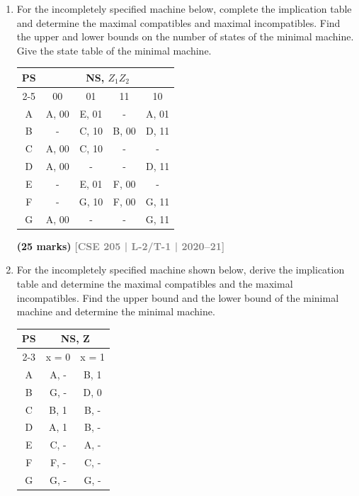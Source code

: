 \documentclass[12pt]{article}
\newcommand{\yr}[1]{\hfill\textcolor{gray}{\small\textbf{[#1]}}}
\newcommand{\mk}[1]{\textcolor{orange!70!black}{\small\textbf{(#1 marks)}}}
\begin{document}
\begin{enumerate}
\mk{15} \yr{CSE 205 | L-2/T-1 | 2021--22}



\item For the incompletely specified machine below, complete the implication table and determine the maximal compatibles and maximal incompatibles. Find the upper and lower bounds on the number of states of the minimal machine. Give the state table of the minimal machine.

\begin{center}
  \begin{tabular}{|c|c|c|c|c|}
\hline
PS & \multicolumn{4}{c|}{NS, $Z_1Z_2$} \\
\cline{2-5}
 & 00 & 01 & 11 & 10 \\
\hline
A & A, 00 & E, 01 & - & A, 01 \\
\hline
B & - & C, 10 & B, 00 & D, 11 \\
\hline
C & A, 00 & C, 10 & - & - \\
\hline
D & A, 00 & - & - & D, 11 \\
\hline
E & - & E, 01 & F, 00 & - \\
\hline
F & - & G, 10 & F, 00 & G, 11 \\
\hline
G & A, 00 & - & - & G, 11 \\
\hline
\end{tabular}
\end{center}
\mk{25} \yr{CSE 205 | L-2/T-1 | 2020--21}



\item For the incompletely specified machine shown below, derive the implication table and determine the maximal compatibles and the maximal incompatibles. Find the upper bound and the lower bound of the minimal machine and determine the minimal machine.

\begin{center}
  \begin{tabular}{|c|c|c|}
\hline
\multirow{2}{*}{PS} & \multicolumn{2}{c|}{NS, Z} \\ \cline{2-3} 
 & x = 0 & x = 1 \\ \hline
A & A, - & B, 1 \\ \hline
B & G, - & D, 0 \\ \hline
C & B, 1 & B, - \\ \hline
D & A, 1 & B, - \\ \hline
E & C, - & A, - \\ \hline
F & F, - & C, - \\ \hline
G & G, - & G, - \\ \hline
\end{tabular}
\end{center}


\end{enumerate}
\end{document}

